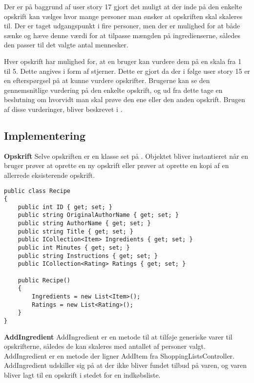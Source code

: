 Der er på baggrund af user story 17 gjort det muligt at der inde på den enkelte opskrift kan vælges hvor mange personer man ønsker at opskriften skal skaleres til.
Der er taget udgangspunkt i fire personer, men der er mulighed for at både sænke og hæve denne værdi for at tilpasse mængden på ingredienserne, således den passer til det valgte antal mennesker.


Hver opskrift har mulighed for, at en bruger kan vurdere dem på en skala fra 1 til 5.
Dette angives i form af stjerner.
Dette er gjort da der i følge user story 15 er en efterspørgsel på at kunne vurdere opskrifter.
Brugerne kan se den gennemsnitlige vurdering på den enkelte opskrift, og ud fra dette tage en beslutning om hvorvidt man skal prøve den ene eller den anden opskrift.
Brugen af disse vurderinger, bliver beskrevet i .


\subsection{Implementering}
\textbf{Opskrift}
Selve opskriften er en klasse set på .
Objektet bliver instantieret når en bruger prøver at oprette en ny opskrift eller prøver at oprette en kopi af en allerrede eksisterende opskrift.


\begin{lstlisting}[caption="Klassen Recipe"]
public class Recipe
{
    public int ID { get; set; }
    public string OriginalAuthorName { get; set; }
    public string AuthorName { get; set; }
    public string Title { get; set; }
    public ICollection<Item> Ingredients { get; set; }
    public int Minutes { get; set; }
    public string Instructions { get; set; }
    public ICollection<Rating> Ratings { get; set; }

    public Recipe()
    {
        Ingredients = new List<Item>();
        Ratings = new List<Rating>();
    }
}
\end{lstlisting}

\textbf{AddIngredient}
AddIngredient er en metode til at tilføje generiske varer til opskrifterne, således de kan skaleres med antallet af personer valgt. 
AddIngredient er en metode der ligner AddItem fra ShoppingListsController. 
AddIngredient udskiller sig på at der ikke bliver fundet tilbud på varen, og varen bliver lagt til en opskrift i stedet for en indkøbsliste.


